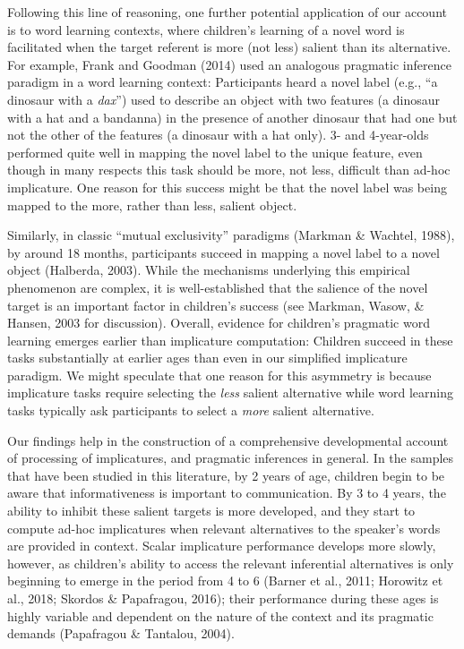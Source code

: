 \documentclass[man]{apa6}
\begin{document}
Following this line of reasoning, one further potential application of
our account is to word learning contexts, where children's learning of a
novel word is facilitated when the target referent is more (not less)
salient than its alternative. For example, Frank and Goodman (2014) used
an analogous pragmatic inference paradigm in a word learning context:
Participants heard a novel label (e.g., \enquote{a dinosaur with a
\emph{dax}}) used to describe an object with two features (a dinosaur
with a hat and a bandanna) in the presence of another dinosaur that had
one but not the other of the features (a dinosaur with a hat only). 3-
and 4-year-olds performed quite well in mapping the novel label to the
unique feature, even though in many respects this task should be more,
not less, difficult than ad-hoc implicature. One reason for this success
might be that the novel label was being mapped to the more, rather than
less, salient object.

Similarly, in classic \enquote{mutual exclusivity} paradigms (Markman \&
Wachtel, 1988), by around 18 months, participants succeed in mapping a
novel label to a novel object (Halberda, 2003). While the mechanisms
underlying this empirical phenomenon are complex, it is well-established
that the salience of the novel target is an important factor in
children's success (see Markman, Wasow, \& Hansen, 2003 for discussion).
Overall, evidence for children's pragmatic word learning emerges earlier
than implicature computation: Children succeed in these tasks
substantially at earlier ages than even in our simplified implicature
paradigm. We might speculate that one reason for this asymmetry is
because implicature tasks require selecting the \emph{less} salient
alternative while word learning tasks typically ask participants to
select a \emph{more} salient alternative.

Our findings help in the construction of a comprehensive developmental
account of processing of implicatures, and pragmatic inferences in
general. In the samples that have been studied in this literature, by 2
years of age, children begin to be aware that informativeness is
important to communication. By 3 to 4 years, the ability to inhibit
these salient targets is more developed, and they start to compute
ad-hoc implicatures when relevant alternatives to the speaker's words
are provided in context. Scalar implicature performance develops more
slowly, however, as children's ability to access the relevant
inferential alternatives is only beginning to emerge in the period from
4 to 6 (Barner et al., 2011; Horowitz et al., 2018; Skordos \&
Papafragou, 2016); their performance during these ages is highly
variable and dependent on the nature of the context and its pragmatic
demands (Papafragou \& Tantalou, 2004).
\end{document}
